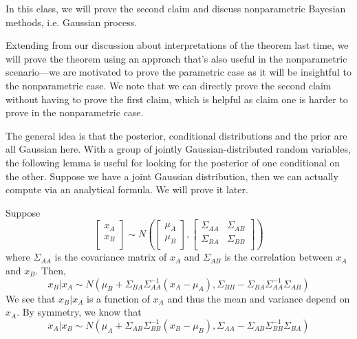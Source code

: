 In this class, we will prove the second claim and discuss nonparametric Bayesian methods, i.e. Gaussian process.


Extending from our discussion about interpretations of the theorem last time, we will prove the theorem using an approach that's also useful in the nonparametric scenario---we are motivated to prove the parametric case as it will be insightful to the nonparametric case. We note that we can directly prove the second claim without having to prove the first claim, which is helpful as claim one is harder to prove in the nonparametric case.

The general idea is that the posterior, conditional distributions and the prior are all Gaussian here. With a group of jointly Gaussian-distributed random variables, the following lemma is useful for looking for the posterior of one conditional on the other. Suppose we have a joint Gaussian distribution, then we can actually compute via an analytical formula. We will prove it later. 

\begin{lemma} \label{lem:Gaussian}
	Suppose 
	\begin{equation*}
		\begin{bmatrix}
			x_A \\
			x_B \\
		\end{bmatrix}
		\sim N(
		\begin{bmatrix}
			\mu_A \\
			\mu_B \\
		\end{bmatrix}
		,
		\begin{bmatrix}
			\Sigma_{AA} & \Sigma_{AB} \\
			\Sigma_{BA} & \Sigma_{BB} \\
		\end{bmatrix}
		)
	\end{equation*}
	where $\Sigma_{AA}$ is the covariance matrix of $x_A$ and $\Sigma_{AB}$ is the correlation between $x_A$ and $x_B$. Then, 
	\begin{equation} \label{eu_eqn}
		x_B | x_A \sim N (\mu_B + \Sigma_{BA} \Sigma_{AA}^{-1} (x_A - \mu_A), \Sigma_{BB} - \Sigma_{BA} \Sigma_{AA}^{-1} \Sigma_{AB})
	\end{equation}
	We see that $x_B | x_A$ is a function of $x_A$ and thus the mean and variance depend on $x_A$. By symmetry, we know that 
	\begin{equation} \label{eu_eqn}x_A | x_B \sim N(\mu_A + \Sigma_{AB} \Sigma_{BB}^{-1} (x_B - \mu_B), \Sigma_{AA} - \Sigma_{AB} \Sigma_{BB}^{-1} \Sigma_{BA})
	\end{equation}
\end{lemma}

